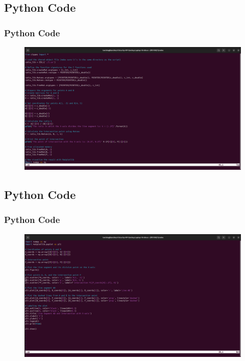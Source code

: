 \documentclass{beamer}
\theoremstyle{remark}
\numberwithin{equation}{section}
\begin{document}
  \subsection{Python Code}
 \begin{frame}
\frametitle{Python Code}
\begin{figure}[h]
    \centering
    \includegraphics[width=\columnwidth]{figs/p1.png}
 \end{figure}    
 \end{frame}

 \subsection{Python Code}
 \begin{frame}
\frametitle{Python Code}
\begin{figure}[h]
    \centering
    \includegraphics[width=\columnwidth]{figs/p2.png}
 \end{figure}    
 \end{frame}
\end{document}
